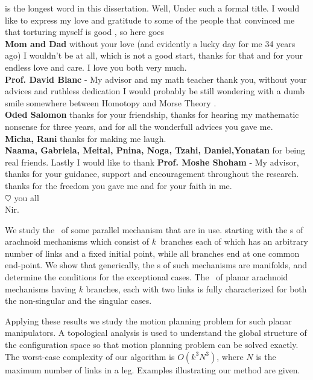 is the longest word in this dissertation. Well, Under such a
formal title. I would like to express my love and gratitude to
some of the people that convinced me that torturing myself is good , so here goes\\
\textbf{Mom and Dad} without your love (and evidently a lucky day
for me 34 years ago) I wouldn't be at all, which is not a good
start, thanks for that and for your endless love and care. I love you both very much.\\
\textbf{Prof. David Blanc} - My advisor and my math teacher thank
you, without your advices and ruthless dedication I would probably
be still wondering with a dumb smile somewhere between Homotopy and Morse Theory .\\
\textbf{Oded Salomon} thanks for your friendship, thanks for
hearing my mathematic nonsense for three years, and for all the
wonderfull advices you gave me.\\ \textbf{Micha, Rani} thanks for
making me laugh.\\ \textbf{Naama, Gabriela, Meital, Pnina, Noga,
Tzahi, Daniel,Yonatan} for being real friends. Lastly I would like
to thank \textbf{Prof. Moshe Shoham} - My advisor, thanks for your
guidance, support and encouragement throughout the research.
thanks for the freedom you gave me and for your faith in me.\\
$\heartsuit$ you all\\
Nir.



We study the \cspace \ of some parallel mechanism that are in use.
starting with the \cspace s of arachnoid mechanisms which consist
of $k$\ branches each of which has an arbitrary number of links
and a fixed initial point, while all branches end at one common
end-point. We show that generically, the \cspace s of such
mechanisms are manifolds, and determine the conditions for the
exceptional cases. The \cspace\  of planar arachnoid mechanisms
having $k$ branches, each with two links is fully characterized
for both the non-singular and the singular cases.

Applying these results we study the motion planning problem for
such planar manipulators. A topological analysis is used to
understand the global structure of the configuration space so that
motion planning problem can be solved exactly. The worst-case
complexity of our algorithm is $O(k^3N^3)$, where $N$ is the
maximum number of links in a leg. Examples illustrating our method
are given.


